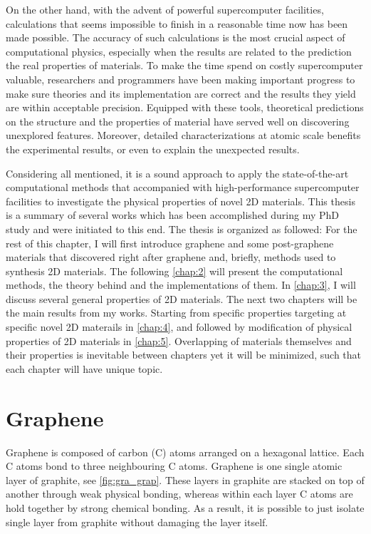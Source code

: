 On the other hand, with the advent of powerful supercomputer facilities, calculations that seems impossible to finish in a reasonable time now has been made possible. The accuracy of such calculations is the most crucial aspect of computational physics, especially when the results are related to the prediction the real properties of materials. To make the time spend on costly supercomputer valuable, researchers and programmers have been making important progress to make sure theories and its implementation are correct and the results they yield are within acceptable precision. Equipped with these tools, theoretical predictions on the structure and the properties of material have served well on discovering unexplored features. Moreover, detailed characterizations at atomic scale benefits the experimental results, or even to explain the unexpected results.

Considering all mentioned, it is a sound approach to apply the state-of-the-art computational methods that accompanied with high-performance supercomputer facilities to investigate the physical properties of novel 2D materials. This thesis is a summary of several works which has been accomplished during my PhD study and were initiated to this end. The thesis is organized as followed: For the rest of this chapter, I will first introduce graphene and some post-graphene materials that discovered right after graphene and, briefly, methods used to synthesis 2D materials. The following \autoref{chap:2} will present the computational methods, the theory behind and the implementations of them. In \autoref{chap:3}, I will discuss several general properties of 2D materials. The next two chapters will be the main results from my works. Starting from specific properties targeting at specific novel 2D materails in \autoref{chap:4}, and followed by modification of physical properties of 2D materials in \autoref{chap:5}. Overlapping of materials themselves and their properties is inevitable between chapters yet it will be minimized, such that each chapter will have unique topic. 


\section{Graphene}

Graphene is composed of carbon (C) atoms arranged on a hexagonal lattice. Each C atoms bond to three neighbouring C atoms. Graphene is one single atomic layer of graphite, see \autoref{fig:gra_grap}. These layers in graphite are stacked on top of another through weak physical bonding, whereas within each layer C atoms are hold together by strong chemical bonding. As a result, it is possible to just isolate single layer from graphite without damaging the layer itself. 

